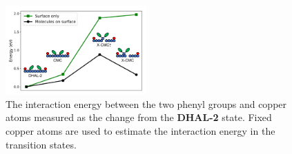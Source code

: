 \documentclass[%
 reprint,
 amsmath,amssymb,
 aps,
prb,
floatfix,
]{revtex4-2}
\newcommand{\comm}{\color{ForestGreen}} %
\begin{document}
\begin{figure}[hbt]
\centering
\includegraphics[width=0.48\textwidth]{Fig/onlysurface.pdf}
\caption{
The interaction energy between the two phenyl groups and copper atoms measured as the change from the \textbf{DHAL-2} state. Fixed copper atoms are used to estimate the interaction energy in the transition states. 
}
\label{fig:onlysurface}
\end{figure}
\end{document}
